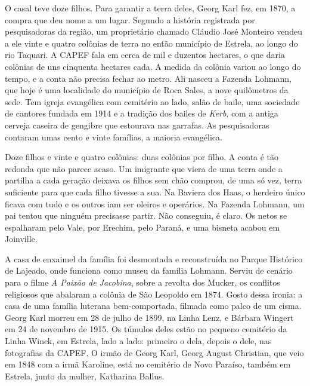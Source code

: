 \documentclass[
  brazilian,
  11pt,
  openany]{book}
\begin{document}
O casal teve doze filhos. Para garantir a terra deles, Georg Karl fez,
em 1870, a compra que deu nome a um lugar. Segundo a história registrada
por pesquisadoras da região, um proprietário chamado Cláudio José
Monteiro vendeu a ele vinte e quatro colônias de terra no então
município de Estrela, ao longo do rio Taquari. A CAPEF fala em cerca de
mil e duzentos hectares, o que daria colônias de uns cinquenta hectares
cada. A medida da colônia variou ao longo do tempo, e a conta não
precisa fechar ao metro. Ali nasceu a Fazenda Lohmann, que hoje é uma
localidade do município de Roca Sales, a nove quilômetros da sede. Tem
igreja evangélica com cemitério ao lado, salão de baile, uma sociedade
de cantores fundada em 1914 e a tradição dos bailes de \emph{Kerb}, com
a antiga cerveja caseira de gengibre que estourava nas garrafas. As
pesquisadoras contaram umas cento e vinte famílias, a maioria
evangélica.

Doze filhos e vinte e quatro colônias: duas colônias por filho. A conta
é tão redonda que não parece acaso. Um imigrante que viera de uma terra
onde a partilha a cada geração deixava os filhos sem chão comprou, de
uma só vez, terra suficiente para que cada filho tivesse a sua. Na
Baviera dos Haas, o herdeiro único ficava com tudo e os outros iam ser
oleiros e operários. Na Fazenda Lohmann, um pai tentou que ninguém
precisasse partir. Não conseguiu, é claro. Os netos se espalharam pelo
Vale, por Erechim, pelo Paraná, e uma bisneta acabou em Joinville.

A casa de enxaimel da família foi desmontada e reconstruída no Parque
Histórico de Lajeado, onde funciona como museu da família Lohmann.
Serviu de cenário para o filme \emph{A Paixão de Jacobina}, sobre a
revolta dos Mucker, os conflitos religiosos que abalaram a colônia de
São Leopoldo em 1874. Gosto dessa ironia: a casa de uma família luterana
bem-comportada, filmada como palco de um cisma. Georg Karl morreu em 28
de julho de 1899, na Linha Lenz, e Bárbara Wingert em 24 de novembro de
1915. Os túmulos deles estão no pequeno cemitério da Linha Winck, em
Estrela, lado a lado: primeiro o dela, depois o dele, nas fotografias da
CAPEF. O irmão de Georg Karl, Georg August Christian, que veio em 1848
com a irmã Karoline, está no cemitério de Novo Paraíso, também em
Estrela, junto da mulher, Katharina Ballus.
\end{document}
